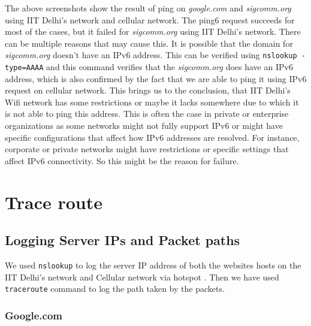\documentclass{article}
\begin{document}
\noindent
The above screenshots show the result of ping on \textit{google.com} and \textit{sigcomm.org} using IIT Delhi's network and cellular network. The ping6 request succeeds for most of the cases, but it failed for \textit{sigcomm.org} using IIT Delhi's network. There can be multiple reasons that may cause this. It is possible that the domain for \textit{sigcomm.org} doesn't have an IPv6 address. This can be verified using \verb|nslookup -type=AAAA| and this command verifies that the \textit{sigcomm.org} does have an IPv6 address, which is also confirmed by the fact that we are able to ping it using IPv6 request on cellular network. This brings us to the conclusion, that IIT Delhi's Wifi network has some restrictions or maybe it lacks somewhere due to which it is not able to ping this address. This is often the case in private or enterprise organizations as some networks might not fully support IPv6 or might have specific configurations that affect how IPv6 addresses are resolved. For instance, corporate or private networks might have restrictions or specific settings that affect IPv6 connectivity. So this might be the reason for failure.

\section{Trace route}

\subsection{Logging Server IPs and Packet paths}

\noindent
We used \verb|nslookup| to log the server IP address of both the websites hosts on the IIT Delhi's network and Cellular network via hotspot . Then we have used \verb|traceroute| command to log the path taken by the packets.

\subsubsection*{Google.com}
\end{document}
